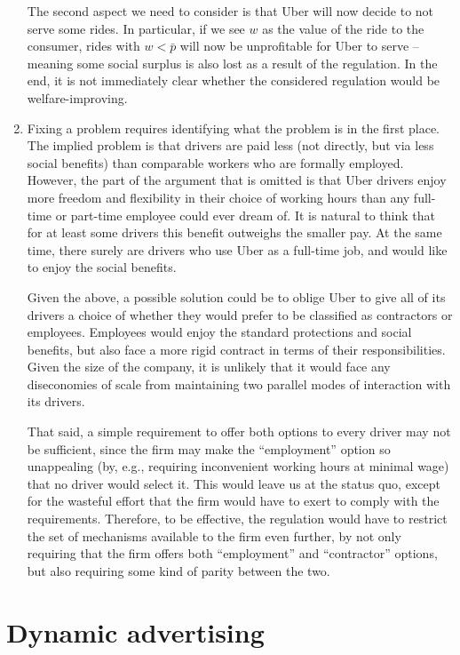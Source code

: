 \documentclass[a4paper]{article}
\begin{document}
\begin{enumerate}
		The second aspect we need to consider is that Uber will now decide to not serve some rides. In particular, if we see $w$ as the value of the ride to the consumer, rides with $w < \bar{p}$ will now be unprofitable for Uber to serve -- meaning some social surplus is also lost as a result of the regulation. In the end, it is not immediately clear whether the considered regulation would be welfare-improving.
		
		\item Fixing a problem requires identifying what the problem is in the first place. The implied problem is that drivers are paid less (not directly, but via less social benefits) than comparable workers who are formally employed. However, the part of the argument that is omitted is that Uber drivers enjoy more freedom and flexibility in their choice of working hours than any full-time or part-time employee could ever dream of. It is natural to think that for at least some drivers this benefit outweighs the smaller pay. At the same time, there surely are drivers who use Uber as a full-time job, and would like to enjoy the social benefits.
		
		Given the above, a possible solution could be to oblige Uber to give all of its drivers a choice of whether they would prefer to be classified as contractors or employees. Employees would enjoy the standard protections and social benefits, but also face a more rigid contract in terms of their responsibilities. Given the size of the company, it is unlikely that it would face any diseconomies of scale from maintaining two parallel modes of interaction with its drivers. 
		
		That said, a simple requirement to offer both options to every driver may not be sufficient, since the firm may make the ``employment'' option so unappealing (by, e.g., requiring inconvenient working hours at minimal wage) that no driver would select it. This would leave us at the status quo, except for the wasteful effort that the firm would have to exert to comply with the requirements. Therefore, to be effective, the regulation would have to restrict the set of mechanisms available to the firm even further, by not only requiring that the firm offers both ``employment'' and ``contractor'' options, but also requiring some kind of parity between the two.
		
	\end{enumerate}
\fi
	
	
	
\section{Dynamic advertising}
	
\end{document}
